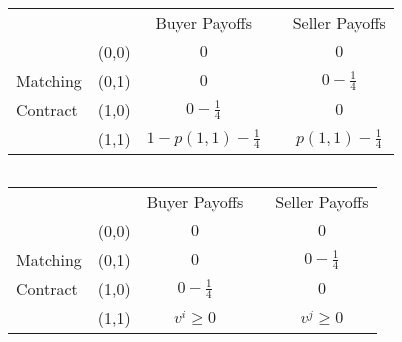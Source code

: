 \documentclass[12pt,letterpaper]{article}           %
\begin{document}
$ $

\newpage


\begin{table}[]
	\begin{tabular}{lcccc}
		&                            & Buyer Payoffs         &                       & Seller Payoffs        \\ \cline{3-3} \cline{5-5} 
		& \multicolumn{1}{c|}{(0,0)} & \multicolumn{1}{c|}{$ 0$} & \multicolumn{1}{c|}{} & \multicolumn{1}{c|}{$ 0$} \\ \cline{3-3} \cline{5-5} 
		Matching & \multicolumn{1}{c|}{(0,1)} & \multicolumn{1}{c|}{$0$} & \multicolumn{1}{c|}{} & \multicolumn{1}{c|}{$0 -\frac{1}{4}$}  \\ \cline{3-3} \cline{5-5} 
		Contract& \multicolumn{1}{c|}{(1,0)} & \multicolumn{1}{c|}{$ 0 - \frac{1}{4}$} & \multicolumn{1}{c|}{} & \multicolumn{1}{c|}{$ 0$} \\ \cline{3-3} \cline{5-5} 
		& \multicolumn{1}{c|}{(1,1)} & \multicolumn{1}{c|}{$ 1-p(1,1) - \frac{1}{4}$} & \multicolumn{1}{c|}{} & \multicolumn{1}{c|}{$ p(1,1)- \frac{1}{4}$} \\ \cline{3-3} \cline{5-5} 
	\end{tabular}
\end{table}

$ $

\newpage


\begin{table}[]
	\begin{tabular}{lcccc}
		&                            & Buyer Payoffs         &                       & Seller Payoffs        \\ \cline{3-3} \cline{5-5} 
		& \multicolumn{1}{c|}{(0,0)} & \multicolumn{1}{c|}{$ 0$} & \multicolumn{1}{c|}{} & \multicolumn{1}{c|}{$ 0$} \\ \cline{3-3} \cline{5-5} 
		Matching & \multicolumn{1}{c|}{(0,1)} & \multicolumn{1}{c|}{$0$} & \multicolumn{1}{c|}{} & \multicolumn{1}{c|}{$0 -\frac{1}{4}$}  \\ \cline{3-3} \cline{5-5} 
		Contract& \multicolumn{1}{c|}{(1,0)} & \multicolumn{1}{c|}{$ 0 - \frac{1}{4}$} & \multicolumn{1}{c|}{} & \multicolumn{1}{c|}{$ 0$} \\ \cline{3-3} \cline{5-5} 
		& \multicolumn{1}{c|}{(1,1)} & \multicolumn{1}{c|}{$ v^i\geq0$} & \multicolumn{1}{c|}{} & \multicolumn{1}{c|}{$ v^j\geq 0$} \\ \cline{3-3} \cline{5-5} 
	\end{tabular}
\end{table}
\end{document}
